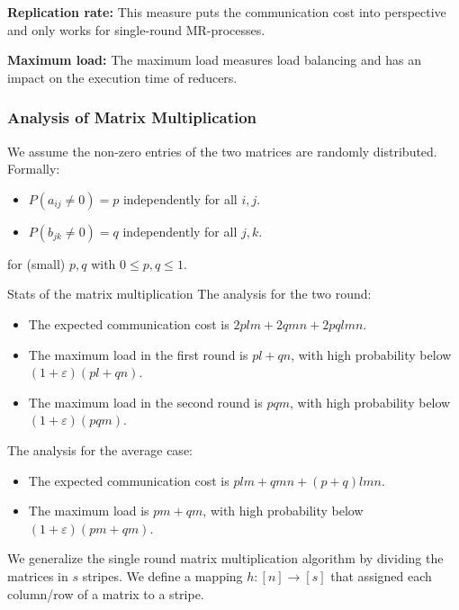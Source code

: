 \documentclass[english]{panikzettel}
\begin{document}
\textbf{Replication rate:} This measure puts the communication cost into perspective and only works for single-round MR-processes.

\textbf{Maximum load:} The maximum load measures load balancing and has an impact on the execution time of reducers.


\subsubsection{Analysis of Matrix Multiplication}
We assume the non-zero entries of the two matrices are randomly distributed.
Formally:
\begin{itemize}
\item $P(a_{ij}\neq 0)=p$ independently for all $i,j$.
\item $P(b_{jk}\neq 0)=q$ independently for all $j,k$.
\end{itemize}
for (small) $p, q$ with $0 \leq p, q \leq 1$.

\begin{theo}{Stats of the matrix multiplication}
The analysis for the two round:
\begin{itemize}[leftmargin=*]
	\item The expected communication cost is $2plm + 2qmn + 2pqlmn$.
	\item The maximum load in the first round is $pl + qn$, with high probability below $(1 + \varepsilon)(pl + qn)$.
	\item The maximum load in the second round is $pqm$, with high probability below $(1 + \varepsilon)(pqm)$.
\end{itemize}
The analysis for the average case:
\begin{itemize}[leftmargin=*]
	\item The expected communication cost is $plm + qmn + (p+q)lmn$.
	\item The maximum load is $pm + qm$, with high probability below $(1 + \varepsilon)(pm + qm)$.
\end{itemize}
\end{theo}

We generalize the single round matrix multiplication algorithm by dividing the matrices in $s$ stripes. We define a mapping $h: [n] \rightarrow [s]$ that assigned each column/row of a matrix to a stripe.
\end{document}
